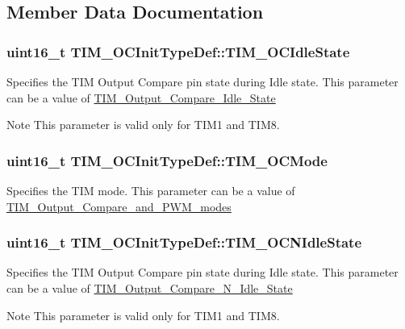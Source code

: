 \subsection{Member Data Documentation}
\hypertarget{structTIM__OCInitTypeDef_a2a28f2d62339e06caef12816e04a8f55}{
\subsubsection[{TIM\_\-OCIdleState}]{\setlength{\rightskip}{0pt plus 5cm}uint16\_\-t {\bf TIM\_\-OCInitTypeDef::TIM\_\-OCIdleState}}}
\label{structTIM__OCInitTypeDef_a2a28f2d62339e06caef12816e04a8f55}
Specifies the TIM Output Compare pin state during Idle state. This parameter can be a value of \hyperlink{group__TIM__Output__Compare__Idle__State}{TIM\_\-Output\_\-Compare\_\-Idle\_\-State} \begin{DoxyNote}{Note}
This parameter is valid only for TIM1 and TIM8. 
\end{DoxyNote}
\hypertarget{structTIM__OCInitTypeDef_ad4338ed2415b0d6d19589bf72b7ba3b0}{
\subsubsection[{TIM\_\-OCMode}]{\setlength{\rightskip}{0pt plus 5cm}uint16\_\-t {\bf TIM\_\-OCInitTypeDef::TIM\_\-OCMode}}}
\label{structTIM__OCInitTypeDef_ad4338ed2415b0d6d19589bf72b7ba3b0}
Specifies the TIM mode. This parameter can be a value of \hyperlink{group__TIM__Output__Compare__and__PWM__modes}{TIM\_\-Output\_\-Compare\_\-and\_\-PWM\_\-modes} \hypertarget{structTIM__OCInitTypeDef_a6cbbe6eb87c2ab49e4d68fa9703ce949}{
\subsubsection[{TIM\_\-OCNIdleState}]{\setlength{\rightskip}{0pt plus 5cm}uint16\_\-t {\bf TIM\_\-OCInitTypeDef::TIM\_\-OCNIdleState}}}
\label{structTIM__OCInitTypeDef_a6cbbe6eb87c2ab49e4d68fa9703ce949}
Specifies the TIM Output Compare pin state during Idle state. This parameter can be a value of \hyperlink{group__TIM__Output__Compare__N__Idle__State}{TIM\_\-Output\_\-Compare\_\-N\_\-Idle\_\-State} \begin{DoxyNote}{Note}
This parameter is valid only for TIM1 and TIM8. 
\end{DoxyNote}
